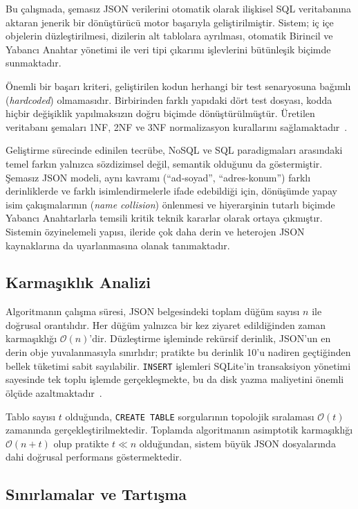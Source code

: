 \documentclass[conference,a4paper,10pt]{IEEEtran}
\begin{document}
Bu çalışmada, şemasız JSON verilerini otomatik olarak ilişkisel SQL veritabanına aktaran jenerik bir dönüştürücü motor başarıyla geliştirilmiştir. Sistem; iç içe objelerin düzleştirilmesi, dizilerin alt tablolara ayrılması, otomatik Birincil ve Yabancı Anahtar yönetimi ile veri tipi çıkarımı işlevlerini bütünleşik biçimde sunmaktadır.

Önemli bir başarı kriteri, geliştirilen kodun herhangi bir test senaryosuna bağımlı (\textit{hardcoded}) olmamasıdır. Birbirinden farklı yapıdaki dört test dosyası, kodda hiçbir değişiklik yapılmaksızın doğru biçimde dönüştürülmüştür. Üretilen veritabanı şemaları 1NF, 2NF ve 3NF normalizasyon kurallarını sağlamaktadır~\cite{normalformler}.

Geliştirme sürecinde edinilen tecrübe, NoSQL ve SQL paradigmaları arasındaki temel farkın yalnızca sözdizimsel değil, semantik olduğunu da göstermiştir. Şemasız JSON modeli, aynı kavramı (``ad-soyad'', ``adres-konum'') farklı derinliklerde ve farklı isimlendirmelerle ifade edebildiği için, dönüşümde yapay isim çakışmalarının (\textit{name collision}) önlenmesi ve hiyerarşinin tutarlı biçimde Yabancı Anahtarlarla temsili kritik teknik kararlar olarak ortaya çıkmıştır. Sistemin özyinelemeli yapısı, ileride çok daha derin ve heterojen JSON kaynaklarına da uyarlanmasına olanak tanımaktadır.

\subsection{Karmaşıklık Analizi}

Algoritmanın çalışma süresi, JSON belgesindeki toplam düğüm sayısı $n$ ile doğrusal orantılıdır. Her düğüm yalnızca bir kez ziyaret edildiğinden zaman karmaşıklığı $\mathcal{O}(n)$'dir. Düzleştirme işleminde rekürsif derinlik, JSON'un en derin obje yuvalanmasıyla sınırlıdır; pratikte bu derinlik 10'u nadiren geçtiğinden bellek tüketimi sabit sayılabilir. \texttt{INSERT} işlemleri SQLite'in transaksiyon yönetimi sayesinde tek toplu işlemde gerçekleşmekte, bu da disk yazma maliyetini önemli ölçüde azaltmaktadır~\cite{sqlite}.

Tablo sayısı $t$ olduğunda, \texttt{CREATE TABLE} sorgularının topolojik sıralaması $\mathcal{O}(t)$ zamanında gerçekleştirilmektedir. Toplamda algoritmanın asimptotik karmaşıklığı $\mathcal{O}(n + t)$ olup pratikte $t \ll n$ olduğundan, sistem büyük JSON dosyalarında dahi doğrusal performans göstermektedir.

\subsection{Sınırlamalar ve Tartışma}
\end{document}
